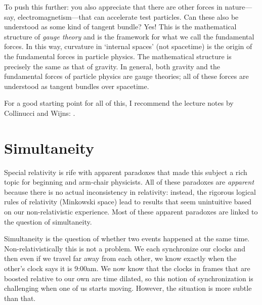 \begin{example}
To push this further: you also appreciate that there are other forces in nature---say, electromagnetism---that can accelerate test particles. Can these also be understood as some kind of tangent bundle? Yes! This is the mathematical structure of \emph{gauge theory} and is the framework for what we call the fundamental forces. In this way, curvature in `internal spaces' (not spacetime) is the origin of the fundamental forces in particle physics. The mathematical structure is precisely the same as that of gravity. In general, both gravity and the fundamental forces of particle physics are gauge theories; all of these forces are understood as tangent bundles over spacetime. 

For a good starting point for all of this, I recommend the lecture notes by Collinucci and Wijns: \cite{Collinucci:2006hx}.
\end{example}

\section{Simultaneity}

Special relativity is rife with apparent paradoxes that made this subject a rich topic for beginning and arm-chair physicists. All of these paradoxes are \emph{apparent} because there is no actual inconsistency in relativity: instead, the rigorous logical rules of relativity (Minkowski space) lead to results that seem unintuitive based on our non-relativistic experience. Most of these apparent paradoxes are linked to the question of simultaneity. 

Simultaneity is the question of whether two events happened at the same time. Non-relativistically this is not a problem. We each synchronize our clocks and then even if we travel far away from each other, we know exactly when the other's clock says it is 9:00am. We now know that the clocks in frames that are boosted relative to our own are time dilated, so this notion of synchronization is challenging when one of us starts moving. However, the situation is more subtle than that. 

